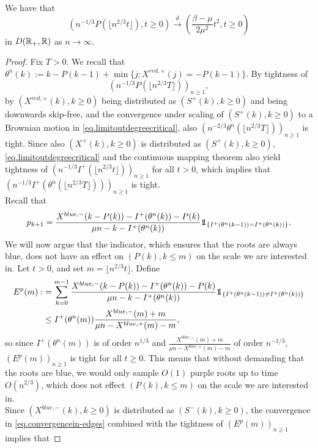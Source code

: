 \begin{lemma}\label{lemma.convergenceQandP}
We have that 
$$\left(n^{-1/3}P(\lfloor n^{2/3}t\rfloor), t \geq 0\right)\overset{d}{\to} \left(\frac{\beta - \mu}{2\mu^2} t^2, t\geq 0\right)$$
in $D({\mathbb R}_+,{\mathbb R})$ as $n\to \infty$.

\end{lemma}
\begin{proof}
Fix $T>0$. We recall that $\theta^{n}(k):=k-P(k-1)+\min\{j: X^{red,+}(j)=-P(k-1)\}$. By tightness of $$\left(n^{-1/3}P\left(\lfloor  n^{2/3}T\rfloor \right) \right)_{n\geq 1},$$ by $(X^{red,+}(k), k\geq 0)$ being distributed as $(S^+(k),k\geq 0)$ and being downwards skip-free, and the convergence under scaling of $(S^+(k),k\geq 0)$ to a Brownian motion in \eqref{eq.limitoutdegreecritical}, also $\left(n^{-2/3}\theta^{n}(\lfloor n^{2/3}T\rfloor )\right)_{n\geq 1}$ is tight.  Since also $(X^+(k),k\geq 0)$ is distributed as $(S^+(k),k\geq 0)$, \eqref{eq.limitoutdegreecritical} and the continuous mapping theorem also yield tightness of $\left(n^{-1/3}I^+(\lfloor n^{2/3} t \rfloor)\right)_{n\geq 1}$ for all $t>0$, which implies that $\left(n^{-1/3}I^+(\theta^{n}(\lfloor n^{2/3} T \rfloor))\right)_{n\geq 1}$ is tight. \\
Recall that
$$p_{k+1}=\frac{X^{blue,-}(k-P(k))-I^+(\theta^{n}(k))-P(k)}{\mu n-k-I^+(\theta^{n}(k))}\one_{\left\{I^+(\theta^n(k-1))= I^+(\theta^n(k))\right\}}.$$
We will now argue that the indicator, which ensures that the roots are always blue, does not have an effect on $(P(k),k\leq m)$ on the scale we are interested in. Let $t>0$, and set $m=\lfloor n^{2/3}t\rfloor$. Define
\begin{align*}\begin{split}
E^p(m):&=\sum_{k=0}^{m-1} \frac{X^{blue,-}(k-P(k))-I^+(\theta^{n}(k))-P(k)}{\mu n-k-I^+(\theta^{n}(k))}\one_{\left\{I^+(\theta^n(k-1))\neq I^+(\theta^n(k))\right\}}\\
&\leq I^+(\theta^n(m)) \frac{X^{blue,-}(m)+m}{\mu n-X^{blue,+}(m)-m},\end{split}\end{align*}
so since $I^+(\theta^n(m))$ is of order $n^{1/3}$ and $\frac{X^{blue,-}(m)+m}{\mu n-X^{blue,+}(m)-m}$ of order $n^{-1/3}$, $(E^p(m))_{n\geq 1}$ is tight for all $t\geq 0$.  This means that without demanding that the roots are blue, we would only sample $O(1)$ purple roots up to time $O(n^{2/3})$, which does not effect $(P(k),k\leq m)$ on the scale we are interested in. \\
 Since $(X^{blue,-}(k),k\geq 0)$ is distributed as $(S^-(k),k\geq 0)$, the convergence in \eqref{eq.convergencein-edges} combined with the tightness of $(E^p(m))_{n\geq 1}$ implies that

\end{proof}
